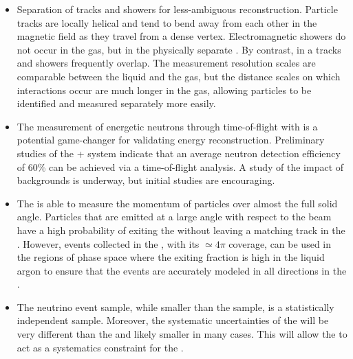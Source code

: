 \begin{itemize}
   
    \item Separation of tracks and showers for less-ambiguous reconstruction.  Particle tracks are locally helical and tend to bend away from each other in the magnetic field as they travel from a dense vertex.  Electromagnetic showers do not occur in the gas, but in the physically separate .  By contrast, in a  tracks and showers frequently overlap.  The measurement resolution scales are comparable between the liquid and the gas, but the distance scales on which interactions occur are much longer in the gas, allowing particles to be identified and measured separately more easily.
   
    \item The measurement of energetic neutrons through time-of-flight with  is a potential game-changer for validating energy reconstruction. Preliminary studies of the + system indicate that an average neutron detection efficiency of 60\% can be achieved via a time-of-flight analysis. A study of the impact of backgrounds is underway, but initial studies are encouraging.
 

    \item{The  is able to measure the momentum of particles over almost the full solid angle.  Particles that are emitted at a large angle with respect to the beam have a high probability of exiting the  without leaving a matching track in the . However, events collected in the , with its $\simeq 4\pi$ coverage, can be used in the regions of phase space where the exiting fraction is high in the liquid argon to ensure that the events are accurately modeled in all directions in the . }
    
    \item{The  neutrino event sample, while smaller than the  sample, is a statistically independent sample. Moreover, the systematic uncertainties of the  will be very different than the  and likely smaller in many cases. This will allow the  to act as a systematics constraint for the .
    }
\end{itemize}



